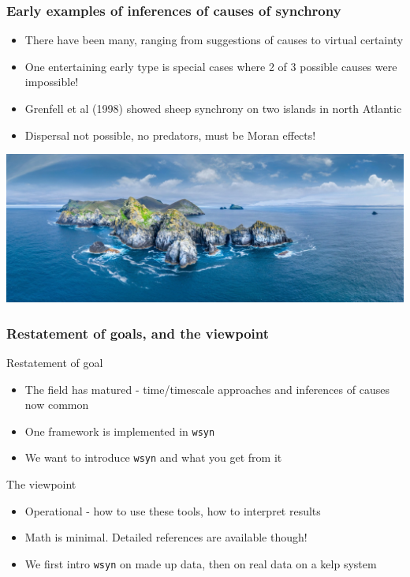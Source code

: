 \documentclass{beamer}
\begin{document}
\begin{frame}
\frametitle{Early examples of inferences of causes of synchrony}
\begin{itemize}
\item There have been many, ranging from suggestions of causes to virtual certainty
\item One entertaining early type is special cases where 2 of 3 possible causes were impossible!
\item Grenfell et al (1998) showed sheep synchrony on two islands in north Atlantic
\item Dispersal not possible, no predators, must be Moran effects!
\end{itemize}
\includegraphics[width=\textwidth]{figures/StKilda.jpg}
\end{frame}

\begin{frame}
\frametitle{Restatement of goals, and the viewpoint}
\begin{block}{Restatement of goal}
\begin{itemize}
\item The field has matured - time/timescale approaches and inferences of causes now common
\item One framework is implemented in \texttt{wsyn}
\item We want to introduce \texttt{wsyn} and what you get from it
\end{itemize}
\end{block}
\begin{block}{The viewpoint}
\begin{itemize}
\item Operational - how to use these tools, how to interpret results
\item Math is minimal. Detailed references are available though!
\item We first intro \texttt{wsyn} on made up data, then on real data on a kelp system
\end{itemize}
\end{block}
\end{frame}
\end{document}
